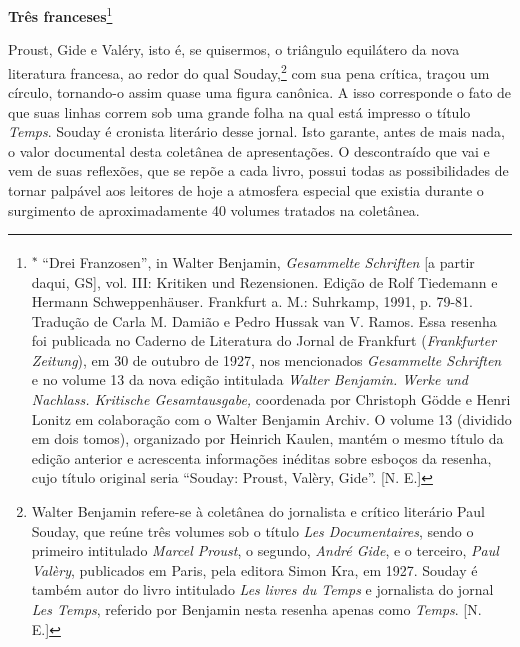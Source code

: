 \textbf{Três franceses}\footnote{\textsuperscript{∗} ``Drei Franzosen'',
  in Walter Benjamin, \emph{Gesammelte Schriften} {[}a partir daqui,
  GS{]}, vol. III: Kritiken und Rezensionen. Edição de Rolf Tiedemann e
  Hermann Schweppenhäuser. Frankfurt a. M.: Suhrkamp, 1991, p. 79-81.
  Tradução de Carla M. Damião e Pedro Hussak van V. Ramos. Essa resenha
  foi publicada no Caderno de Literatura do Jornal de Frankfurt
  (\emph{Frankfurter Zeitung}), em 30 de outubro de 1927, nos
  mencionados \emph{Gesammelte Schriften} e no volume 13 da nova edição
  intitulada \emph{Walter Benjamin. Werke und Nachlass. Kritische
  Gesamtausgabe,} coordenada por Christoph Gödde e Henri Lonitz em
  colaboração com o Walter Benjamin Archiv. O volume 13 (dividido em
  dois tomos), organizado por Heinrich Kaulen, mantém o mesmo título da
  edição anterior e acrescenta informações inéditas sobre esboços da
  resenha, cujo título original seria ``Souday: Proust, Valèry, Gide''.
  {[}N. E.{]}}

Proust, Gide e Valéry, isto é, se quisermos, o triângulo equilátero da
nova literatura francesa, ao redor do qual Souday,\footnote{Walter
  Benjamin refere-se à coletânea do jornalista e crítico literário Paul
  Souday, que reúne três volumes sob o título \emph{Les Documentaires},
  sendo o primeiro intitulado \emph{Marcel Proust}, o segundo,
  \emph{André Gide}, e o terceiro, \emph{Paul Valèry}, publicados em
  Paris, pela editora Simon Kra, em 1927. Souday é também autor do livro
  intitulado \emph{Les livres du Temps} e jornalista do jornal \emph{Les
  Temps}, referido por Benjamin nesta resenha apenas como \emph{Temps}.
  {[}N. E.{]}} com sua pena crítica, traçou um círculo, tornando-o assim
quase uma figura canônica. A isso corresponde o fato de que suas linhas
correm sob uma grande folha na qual está impresso o título \emph{Temps}.
Souday é cronista literário desse jornal. Isto garante, antes de mais
nada, o valor documental desta coletânea de apresentações. O
descontraído que vai e vem de suas reflexões, que se repõe a cada livro,
possui todas as possibilidades de tornar palpável aos leitores de hoje a
atmosfera especial que existia durante o surgimento de aproximadamente
40 volumes tratados na coletânea.

